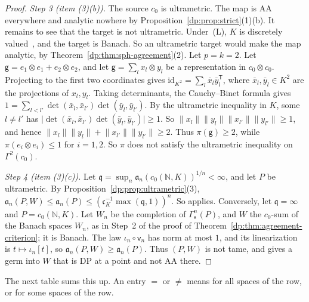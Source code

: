 \documentclass[11pt]{amsart}
\theoremstyle{definition}
\theoremstyle{remark}
\numberwithin{equation}{section}
\newcommand{\N}{\mathbb N}
\newcommand{\id}{\mathrm{id}}
\newcommand{\abs}[1]{\lvert #1\rvert}
\newcommand{\norm}[1]{\lVert #1\rVert}
\theoremstyle{plain}
\theoremstyle{definition}
\theoremstyle{plain}
\begin{document}
\begin{proof}
\emph{Step 3 (item (3)(b)).} The source $c_0$ is ultrametric. The map is AA everywhere and analytic nowhere by Proposition~\ref{dp:prop:strict}(1)(b). It remains to see that the target is not ultrametric. Under~(L), $K$ is discretely valued~\cite[Section~7.1]{I}, and the target is Banach. So an ultrametric target would make the map analytic, by Theorem~\ref{dp:thm:sph-agreement}(2). Let $p=k=2$. Let $\mathsf g=e_1\otimes e_1+e_2\otimes e_2$, and let $\mathsf g=\sum_lx_l\otimes y_l$ be a representation in $c_0\otimes c_0$. Projecting to the first two coordinates gives $\id_{K^2}=\sum_l\bar x_l\bar y_l^{\mathsf T}$, where $\bar x_l,\bar y_l\in K^2$ are the projections of $x_l,y_l$. Taking determinants, the Cauchy--Binet formula gives $1=\sum_{l<l'}\det(\bar x_l,\bar x_{l'})\det(\bar y_l,\bar y_{l'})$. By the ultrametric inequality in $K$, some $l\ne l'$ has $\abs{\det(\bar x_l,\bar x_{l'})\det(\bar y_l,\bar y_{l'})}\ge1$. So $\norm{x_l}\norm{y_l}\norm{x_{l'}}\norm{y_{l'}}\ge1$, and hence $\norm{x_l}\norm{y_l}+\norm{x_{l'}}\norm{y_{l'}}\ge2$. Thus $\pi(\mathsf g)\ge2$, while $\pi(e_i\otimes e_i)\le1$ for $i=1,2$. So $\pi$ does not satisfy the ultrametric inequality on $\Gamma^2(c_0)$.

\emph{Step 4 (item (3)(c)).} Let $\mathfrak q=\sup_n\mathfrak a_n(c_0(\N,K))^{1/n}<\infty$, and let $P$ be ultrametric. By Proposition~\ref{dp:prop:ultrametric}(3), $\mathfrak a_n(P,W)\le\mathfrak a_n(P)\le(\mathfrak c_K^{-1}\max(\mathfrak q,1))^n$. So \cite[Theorem~14.38(1)]{I} applies. Conversely, let $\mathfrak q=\infty$ and $P=c_0(\N,K)$. Let $W_n$ be the completion of $\Gamma^n_{\mathrm s}(P)$, and $W$ the $c_0$-sum of the Banach spaces $W_n$, as in Step~2 of the proof of Theorem~\ref{dp:thm:agreement-criterion}; it is Banach. The law $\iota_n\circ\mathsf v_n$ has norm at most $1$, and its linearization is $t\mapsto\iota_n[t]$, so $\mathfrak a_n(P,W)\ge\mathfrak a_n(P)$. Thus $(P,W)$ is not tame, and \cite[Proposition~14.37]{I} gives a germ into $W$ that is DP at a point and not AA there.
\end{proof}

The next table sums this up. An entry $=$ or $\ne$ means for all spaces of the row, or for some spaces of the row.
\end{document}
